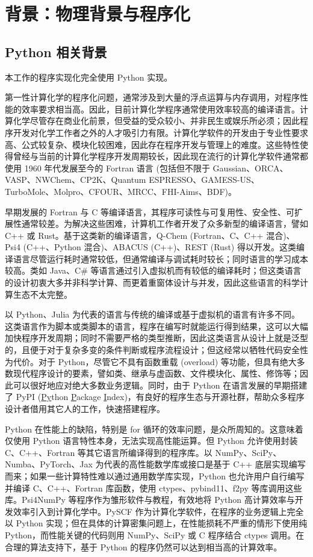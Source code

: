 \section{背景：物理背景与程序化}
\label{sec.3.3.background}

\subsection{Python 相关背景}

本工作的程序实现化完全使用 Python 实现。

第一性计算化学的程序化问题，通常涉及到大量的浮点运算与内存调用，对程序性能的效率要求相当高。因此，目前计算化学程序通常使用效率较高的编译语言。计算化学尽管存在商业化前景，但受益的受众较小、并非民生或娱乐所必须；因此程序开发对化学工作者之外的人才吸引力有限。计算化学软件的开发由于专业性要求高、公式较复杂、模块化较困难，因此存在程序开发与管理上的难度。这些特性使得曾经与当前的计算化学程序开发周期较长，因此现在流行的计算化学软件通常都使用 1960 年代发展至今的 Fortran 语言 (包括但不限于 Gaussian、ORCA、VASP、NWChem、CP2K、Quantum ESPRESSO、GAMESS-US、TurboMole、Molpro、CFOUR、MRCC、FHI-Aims、BDF)。

早期发展的 Fortran 与 C 等编译语言，其程序可读性与可复用性、安全性、可扩展性通常较差。为解决这些困难，计算机工作者开发了众多新型的编译语言，譬如 C++ 或 Rust。基于这类新的编译语言，Q-Chem (Fortran、C、C++ 混合)、Psi4 (C++、Python 混合)、ABACUS (C++)、REST (Rust) 得以开发。这类编译语言尽管运行耗时通常较低，但通常编译与调试耗时较长；同时语言的学习成本较高。类如 Java、C\# 等语言通过引入虚拟机而有较低的编译耗时；但这类语言的设计初衷大多并非科学计算、而更着重窗体设计与并发，因此这些语言的科学计算生态不太完整。

以 Python、Julia 为代表的语言与传统的编译或基于虚拟机的语言有许多不同。这类语言作为脚本或类脚本的语言，程序在编写时就能运行得到结果，这可以大幅加快程序开发周期；同时不需要严格的类型推断，因此这类语言从设计上就是泛型的，且便于对于复杂多变的条件判断或程序流程设计；但这经常以牺牲代码安全性为代价。对于 Python，尽管它不具有函数重载 (overload) 等功能，但具有绝大多数现代程序设计的要素，譬如类、继承与虚函数、文件模块化、属性、修饰等；因此可以很好地应对绝大多数业务逻辑。同时，由于 Python 在语言发展的早期搭建了 PyPI (\underline{Py}thon \underline{P}ackage \underline{I}ndex)，有良好的程序生态与开源社群，帮助众多程序设计者借用其它人的工作，快速搭建程序。

Python 在性能上的缺陷，特别是 for 循环的效率问题，是众所周知的。这意味着仅使用 Python 语言特性本身，无法实现高性能运算。但 Python 允许使用封装 C、C++、Fortran 等其它语言所编译得到的程序库。以 NumPy、SciPy、Numba、PyTorch、Jax 为代表的高性能数学库或接口是基于 C++ 底层实现编写而来；如果一些计算特性难以通过通用数学库实现，Python 也允许用户自行编写并编译 C、C++、Fortran 库函数，使用 ctypes、pybind11、f2py 等库调用这些库。Psi4NumPy 等程序作为雏形软件与教程，有效地将 Python 高计算效率与开发效率引入到计算化学中。PySCF 作为计算化学软件，在程序的业务逻辑上完全以 Python 实现；但在具体的计算密集问题上，在性能损耗不严重的情形下使用纯 Python，而性能关键的代码则用 NumPy、SciPy 或 C 程序结合 ctypes 调用。在合理的算法支持下，基于 Python 的程序仍然可以达到相当高的计算效率。

